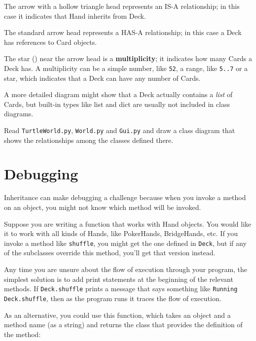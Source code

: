 \documentclass[10pt]{book}
\begin{document}
\begin{CJK}{UTF8}{gbsn}
The arrow with a hollow triangle head represents an IS-A
relationship; in this case it indicates that Hand inherits
from Deck.

The standard arrow head represents a HAS-A
relationship; in this case a Deck has references to Card
objects.

The star ({\tt *}) near the arrow head is a 
{\bf multiplicity}; it indicates how many Cards a Deck has.
A multiplicity can be a simple number, like {\tt 52}, a range,
like {\tt 5..7} or a star, which indicates that a Deck can
have any number of Cards.

A more detailed diagram might show that a Deck actually
contains a {\em list} of Cards, but built-in types
like list and dict are usually not included in class diagrams.

\begin{exercise}

Read {\tt TurtleWorld.py}, {\tt World.py} and {\tt Gui.py}
and draw a class diagram that shows the relationships among
the classes defined there.

\end{exercise}


\section{Debugging}

Inheritance can make debugging a challenge because when you
invoke a method on an object, you might not know which method
will be invoked.

Suppose you are writing a function that works with Hand objects.
You would like it to work with all kinds of Hands, like
PokerHands, BridgeHands, etc.  If you invoke a method like
{\tt shuffle}, you might get the one defined in {\tt Deck},
but if any of the subclasses override this method, you'll
get that version instead.  

Any time you are unsure about the flow of execution through your
program, the simplest solution is to add print statements at the
beginning of the relevant methods.  If {\tt Deck.shuffle} prints a
message that says something like {\tt Running Deck.shuffle}, then as
the program runs it traces the flow of execution.

As an alternative, you could use this function, which takes an
object and a method name (as a string) and returns the class that
provides the definition of the method:


\end{CJK}
\end{document}
